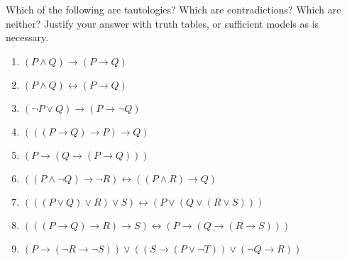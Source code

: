 \documentclass[10.5pt]{article}
\newenvironment{problem}[2][Problem]{\begin{trivlist}
\item[\hskip \labelsep {\bfseries #1}\hskip \labelsep {\bfseries #2.}]}{\end{trivlist}}
\begin{document}
\vskip 0.5in
\newpage
\begin{problem}{2}
Which of the following are tautologies?  Which are contradictions?  Which are neither?  Justify your answer with truth tables, or sufficient models as is necessary.
\begin{enumerate}
  \parskip=0in
  \parsep=0in
  \itemsep=0in
\item $(P \wedge Q) \rightarrow (P \rightarrow Q)$
\item $(P \wedge Q) \leftrightarrow (P \rightarrow Q)$
\item $(\lnot P \vee Q) \rightarrow (P \rightarrow \lnot Q)$
\item $(((P \rightarrow Q) \rightarrow P) \rightarrow Q)$
\item $(P \rightarrow (Q \rightarrow (P \rightarrow Q)))$
\item $((P \wedge \lnot Q) \rightarrow \lnot R) \leftrightarrow ((P \wedge R) \rightarrow Q)$
\item $(((P \vee Q) \vee R) \vee S) \leftrightarrow (P \vee (Q \vee (R \vee S)))$
\item $(((P \rightarrow Q) \rightarrow R) \rightarrow S) \leftrightarrow (P \rightarrow (Q \rightarrow (R \rightarrow S)))$
\item $(P \rightarrow (\lnot R \rightarrow \lnot S)) \vee ((S \rightarrow (P \vee \lnot T)) \vee (\lnot Q \rightarrow R))$
\end{enumerate}
\end{problem}
\end{document}
